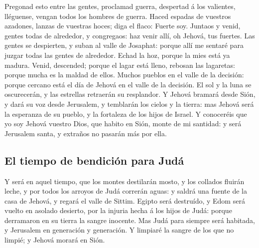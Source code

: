  Pregonad esto entre las gentes, proclamad guerra,
despertad á los valientes, lléguense, vengan todos los hombres de
guerra.  Haced espadas de vuestros azadones, lanzas de
vuestras hoces; diga el flaco: Fuerte soy.  Juntaos y
venid, gentes todas de alrededor, y congregaos: haz venir allí, oh
Jehová, tus fuertes.  Las gentes se despierten, y suban
al valle de Josaphat: porque allí me sentaré para juzgar todas las
gentes de alrededor.  Echad la hoz, porque la mies está
ya madura. Venid, descended; porque el lagar está lleno, rebosan las
lagaretas: porque mucha es la maldad de ellos.  Muchos
pueblos en el valle de la decisión: porque cercano está el día de Jehová
en el valle de la decisión.  El sol y la luna se
oscurecerán, y las estrellas retraerán su resplandor.  Y
Jehová bramará desde Sión, y dará su voz desde Jerusalem, y temblarán
los cielos y la tierra: mas Jehová será la esperanza de su pueblo, y la
fortaleza de los hijos de Israel.  Y conoceréis que yo
soy Jehová vuestro Dios, que habito en Sión, monte de mi santidad: y
será Jerusalem santa, y extraños no pasarán más por ella.

\hypertarget{el-tiempo-de-bendiciuxf3n-para-juduxe1}{%
\subsection{El tiempo de bendición para
Judá}\label{el-tiempo-de-bendiciuxf3n-para-juduxe1}}

 Y será en aquel tiempo, que los montes destilarán mosto,
y los collados fluirán leche, y por todos los arroyos de Judá correrán
aguas: y saldrá una fuente de la casa de Jehová, y regará el valle de
Sittim.  Egipto será destruído, y Edom será vuelto en
asolado desierto, por la injuria hecha á los hijos de Judá: porque
derramaron en su tierra la sangre inocente.  Mas Judá
para siempre será habitada, y Jerusalem en generación y generación.
 Y limpiaré la sangre de los que no limpié; y Jehová
morará en Sión.
